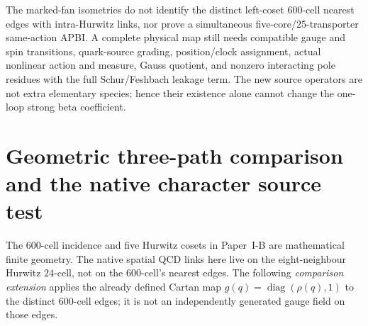 \documentclass[12pt,a4paper]{article}
\begin{document}
\begin{remark}
\label{p10:rem:v3023-global-apbi-remains-open}
The marked-fan isometries do not identify the distinct left-coset
600-cell nearest edges with intra-Hurwitz links, nor prove a
simultaneous five-core/25-transporter same-action APBI. A complete
physical map still needs compatible gauge and spin transitions,
quark-source grading, position/clock assignment, actual nonlinear
action and measure, Gauss quotient, and nonzero interacting pole
residues with the full Schur/Feshbach leakage term. The new source
operators are not extra elementary species; hence their existence
alone cannot change the one-loop strong beta coefficient.
\end{remark}


\section{Geometric three-path comparison and the native character source test}
\label{p10:sec:v3027-600-hurwitz-cartans}
The $600$-cell incidence and five Hurwitz cosets in Paper~I-B are
mathematical finite geometry. The native spatial QCD links here live
on the eight-neighbour Hurwitz $24$-cell, not on the $600$-cell's
nearest edges. The following \emph{comparison extension} applies
the already defined Cartan map
$g(q)=\operatorname{diag}(\rho(q),1)$ to the distinct $600$-cell edges;
it is not an independently generated gauge field on those edges.
\end{document}
